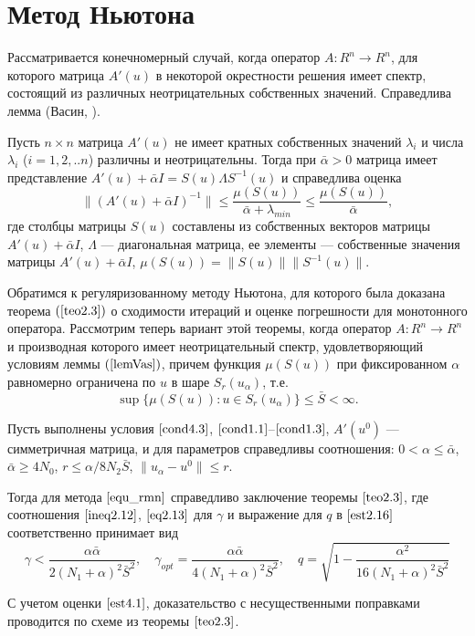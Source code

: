 \section{Метод Ньютона}
Рассматривается конечномерный случай, когда оператор $A\colon R^n \to R^n$, для которого матрица $A'(u)$ в некоторой окрестности решения имеет спектр, состоящий из различных неотрицательных собственных значений.
Справедлива лемма (Васин, \cite{VasSkur2017}).
\begin{lemma}\label{lemVas}
	Пусть $n\times n$ матрица $A'(u)$ не имеет кратных собственных значений $\lambda _i$ и числа $\lambda _i$ ($i=1,2,..n$) различны и неотрицательны. Тогда при $\bar\alpha>0$ матрица имеет представление $A'(u)+\bar\alpha I =S(u)\Lambda S^{-1}(u)$ и справедлива оценка
	\begin{equation}\label{est4.1}
	\|(A'(u)+\bar\alpha I)^{-1}\|\le \frac{\mu (S(u))}{\bar\alpha+\lambda_{min}} \le \frac{\mu(S(u))}{\bar\alpha},
	\end{equation}
	где столбцы матрицы $S(u)$ составлены из собственных векторов матрицы $A'(u)+\bar\alpha I$, $\Lambda$ --- диагональная матрица, ее элементы --- собственные значения матрицы $A'(u)+\bar\alpha I$, $\mu(S(u))=\|S(u)\|\|S^{-1}(u)\|$.
\end{lemma}
Обратимся к регуляризованному методу Ньютона, для которого была доказана теорема $(\ref{teo2.3})$ о сходимости итераций и оценке погрешности для монотонного оператора. Рассмотрим теперь вариант этой теоремы, когда оператор $A\colon R^n \to R^n$ и производная которого имеет неотрицательный спектр, удовлетворяющий условиям леммы $(\ref{lemVas})$, причем функция $\mu(S(u))$ при фиксированном $\alpha$ равномерно ограничена по $u$ в шаре $S_r(u_\alpha)$, т.е.
\begin{equation}\label{cond4.3}
\sup\{\mu(S(u)): u\in S_r(u_\alpha)\}\le\bar S <\infty .
\end{equation}
\begin{theorem}\label{teo4.1}
	Пусть выполнены условия $\eqref{cond4.3}$, $\eqref{cond1.1}$--$\eqref{cond1.3}$, $A'(u^0)$ --- симметричная матрица, и для параметров справедливы соотношения: $0<\alpha\le\bar\alpha$, $\bar\alpha\ge 4N_0$, $r\le\alpha/8N_2\bar S$, $\|u_\alpha-u^0\|\le r$.
	
	Тогда для метода $\eqref{equ_rmn}$ справедливо заключение теоремы $\ref{teo2.3}$, где соотношения $\eqref{ineq2.12}$, $\eqref{eq2.13}$ для $\gamma$ и выражение для $q$ в $\eqref{est2.16}$ соответственно принимает вид
	$$\gamma < \frac{\alpha\bar\alpha}{2(N_1+\alpha)^2\bar S^2}, \quad \gamma _{opt}=\frac{\alpha\bar\alpha}{4(N_1+\alpha)^2\bar S^2}, \quad q=\sqrt{1-\frac{\alpha ^2}{16(N_1+\alpha)^2\bar S^2}}$$
\end{theorem}
\proof С учетом оценки $\eqref{est4.1}$, доказательство с несущественными поправками проводится по схеме из теоремы $\ref{teo2.3}$.

